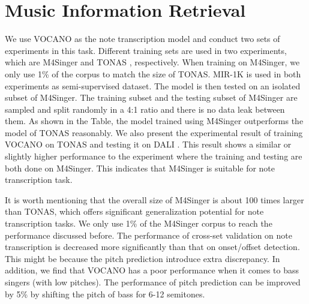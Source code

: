 \section{Music Information Retrieval}

We use VOCANO \citep{vocano} as the note transcription model and conduct two sets of experiments in this task. Different training sets are used in two experiments, which are M4Singer and TONAS \citep{Mora2010} \citep{Bonada2013}, respectively. When training on M4Singer, we only use 1\% of the corpus to match the size of TONAS. MIR-1K \citep{} is used in both experiments as semi-supervised dataset. The model is then tested on an isolated subset of M4Singer. The training subset and the testing subset of M4Singer are sampled and split randomly in a 4:1 ratio and there is no data leak between them. As shown in the Table, the model trained using M4Singer outperforms the model of TONAS reasonably. We also present the experimental result of training VOCANO on TONAS and testing it on DALI \citep{meseguer2019dali}. This result shows a similar or slightly higher performance to the experiment where the training and testing are both done on M4Singer. This indicates that M4Singer is suitable for note transcription task. 

It is worth mentioning that the overall size of M4Singer is about 100 times larger than TONAS, which offers significant generalization potential for note transcription tasks. We only use 1\% of the M4Singer corpus to reach the performance discussed before. The performance of cross-set validation on note transcription is decreased more significantly than that on onset/offset detection. This might be because the pitch prediction introduce extra discrepancy. In addition, we find that VOCANO has a poor performance when it comes to bass singers (with low pitches). The performance of pitch prediction can be improved by 5\% by shifting the pitch of bass for 6-12 semitones.